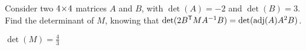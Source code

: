 
\begin{Exercise}[
name={},
title={}, 
difficulty=0,
origin={\cite{MB}}]
Consider two $4 \! \times \! 4$ matrices $A$ and $B$, with $\det(A) = -2$ and $\det(B) = 3$. Find the determinant of $M$, knowing that $\det(2{{B}^{\mathsf{T}}}MA^{-1}B)=\det(\operatorname{adj}(A)A^2B)$.
\end{Exercise}

\begin{Answer}
$\det(M)=\frac{4}{3}$
\end{Answer}
